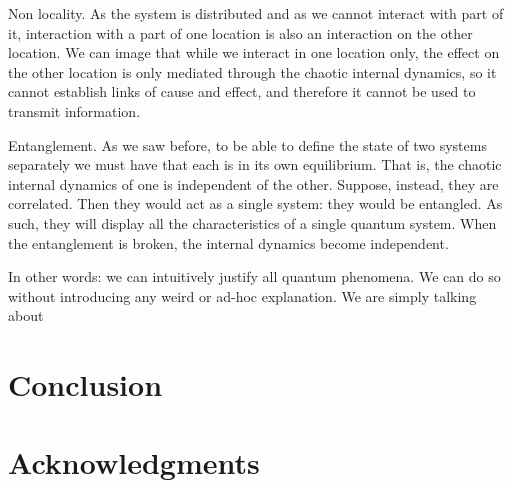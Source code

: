 \documentclass[letterpaper]{article}
\theoremstyle{plain}%
\theoremstyle{definition}
\theoremstyle{remark}
\begin{document}
Non locality. As the system is distributed and as we cannot interact with part of it, interaction with a part of one location is also an interaction on the other location. We can image that while we interact in one location only, the effect on the other location is only mediated through the chaotic internal dynamics, so it cannot establish links of cause and effect, and therefore it cannot be used to transmit information.

Entanglement. As we saw before, to be able to define the state of two systems separately we must have that each is in its own equilibrium. That is, the chaotic internal dynamics of one is independent of the other. Suppose, instead, they are correlated. Then they would act as a single system: they would be entangled. As such, they will display all the characteristics of a single quantum system. When the entanglement is broken, the internal dynamics become independent.

In other words: we can intuitively justify all quantum phenomena. We can do so without introducing any weird or ad-hoc explanation. We are simply talking about 




\section{Conclusion}


\section{Acknowledgments}


\end{document}
